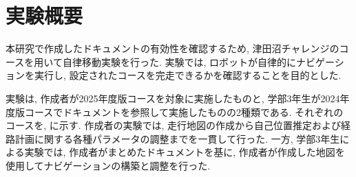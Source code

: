 \section{実験概要}
本研究で作成したドキュメントの有効性を確認するため, 津田沼チャレンジのコースを用いて自律移動実験を行った. 
実験では, ロボットが自律的にナビゲーションを実行し, 設定されたコースを完走できるかを確認することを目的とした. 

実験は, 作成者が2025年度版コースを対象に実施したものと, 学部3年生が2024年度版コースでドキュメントを参照して実施したものの2種類である. 
それぞれのコースを, に示す.
作成者の実験では, 走行地図の作成から自己位置推定および経路計画に関する各種パラメータの調整までを一貫して行った. 
一方, 学部3年生による実験では, 作成者がまとめたドキュメントを基に, 作成者が作成した地図を使用してナビゲーションの構築と調整を行った. 

